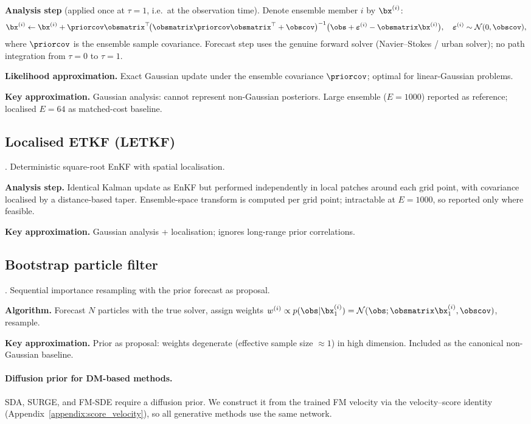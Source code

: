 \textbf{Analysis step} (applied once at $\tau=1$, i.e.\ at the observation time).
Denote ensemble member $i$ by $\bx^{(i)}$:
\begin{align}
  \bx^{(i)} \leftarrow \bx^{(i)}
  + \priorcov\obsmatrix^\top\!\bigl(\obsmatrix\priorcov\obsmatrix^\top+\obscov\bigr)^{-1}
    \bigl(\obs + \boldsymbol\varepsilon^{(i)} - \obsmatrix\bx^{(i)}\bigr),
  \quad \boldsymbol\varepsilon^{(i)}\sim\mathcal{N}(0,\obscov),
\end{align}
where $\priorcov$ is the ensemble sample covariance. Forecast step uses the genuine forward solver (Navier--Stokes / urban solver); no path integration from $\tau=0$ to $\tau=1$.

\textbf{Likelihood approximation.}
Exact Gaussian update under the ensemble covariance $\priorcov$; optimal for linear-Gaussian problems.

\textbf{Key approximation.}
Gaussian analysis: cannot represent non-Gaussian posteriors.
Large ensemble ($E=1000$) reported as reference; localised $E=64$ as matched-cost baseline.

\subsection{Localised ETKF (LETKF)}\label{appendix:method:letkf}

\cite{hunt_efficient_2007}. Deterministic square-root EnKF with spatial localisation.

\textbf{Analysis step.}
Identical Kalman update as EnKF but performed independently in local patches around each grid point, with covariance localised by a distance-based taper.
Ensemble-space transform is computed per grid point; intractable at $E=1000$, so reported only where feasible.

\textbf{Key approximation.}
Gaussian analysis + localisation; ignores long-range prior correlations.

\subsection{Bootstrap particle filter}\label{appendix:method:pf}

\cite{carrassi_data_2018}. Sequential importance resampling with the prior forecast as proposal.

\textbf{Algorithm.}
Forecast $N$ particles with the true solver, assign weights $w^{(i)}\propto p(\obs|\bx_1^{(i)})
= \mathcal{N}(\obs;\obsmatrix\bx_1^{(i)},\obscov)$, resample.

\textbf{Key approximation.}
Prior as proposal: weights degenerate (effective sample size $\approx 1$) in high dimension.
Included as the canonical non-Gaussian baseline.

\paragraph{Diffusion prior for DM-based methods.}
SDA, SURGE, and FM-SDE require a diffusion prior.
We construct it from the trained FM velocity via the velocity--score identity (Appendix~\ref{appendix:score_velocity}),
so all generative methods use the same network.
